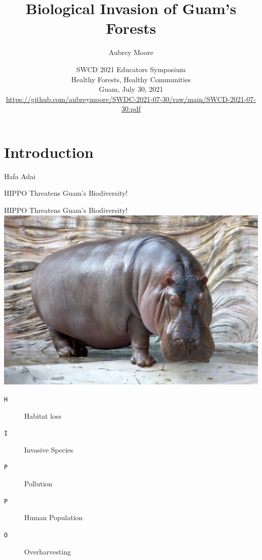\documentclass[]{beamer}
\title[Biological Invasion of Guam's Forests]{Biological Invasion of Guam's Forests}
\author{Aubrey Moore}
\institute[University of Guam]{College of Natural and Applied Sciences\\University of Guam}
\date[]{SWCD 2021 Educators Symposium\\Healthy Forests, Healthy Communities\\Guam, July 30, 2021\\ \tiny\url{https://github.com/aubreymoore/SWDC-2021-07-30/raw/main/SWCD-2021-07-30.pdf}}
\begin{document}
\maketitle

\section*{Introduction}

\begin{frame}{Hafa Adai}
\end{frame}

\begin{frame}{HIPPO Threatens Guam's Biodiversity!}
\end{frame}
 
\begin{frame}{HIPPO Threatens Guam's Biodiversity!}
    \includegraphics[height=0.5\textheight]{hippo.jpg}
    \begin{description}
        \item [\texttt{H}] Habitat loss
        \item [\texttt{I}] Invasive Species
        \item [\texttt{P}] Pollution 
        \item [\texttt{P}] Human Population
        \item [\texttt{O}] Overharvesting
    \end{description}
\end{frame}
\end{document}
